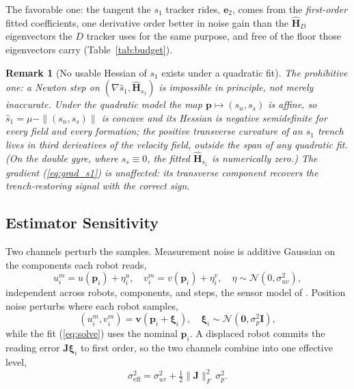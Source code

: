 \documentclass[lettersize,journal]{IEEEtran}
\newtheorem{remark}{Remark}
\begin{document}
The favorable one: the tangent the $s_1$ tracker rides,
$\mathbf{e}_2$, comes from the \emph{first-order} fitted coefficients,
one derivative order better in noise gain than the
$\hat{\mathbf{H}}_D$ eigenvectors the $D$ tracker uses for the same
purpose, and free of the floor those eigenvectors carry
(Table~\ref{tab:budget}).

\begin{remark}[No usable Hessian of $s_1$ exists under a quadratic fit]
\label{rem:s1hess}
The prohibitive one: a Newton step on $(\nabla \hat{s}_1,
\hat{\mathbf{H}}_{s_1})$ is impossible in principle, not merely
inaccurate. Under the quadratic model the map $\mathbf{p} \mapsto (s_n,
s_s)$ is affine, so $\hat{s}_1 = \mu - \|(s_n, s_s)\|$ is concave and its
Hessian is negative semidefinite \emph{for every field and every
formation}; the positive transverse curvature of an $s_1$ trench lives
in third derivatives of the velocity field, outside the span of any
quadratic fit. (On the double gyre, where $s_s \equiv 0$, the fitted
$\hat{\mathbf{H}}_{s_1}$ is numerically zero.) The gradient
(\ref{eq:grad_s1}) is unaffected: its transverse component recovers the
trench-restoring signal with the correct sign.
\end{remark}

\subsection{Estimator Sensitivity}
\label{sec:sensitivity}

Two channels perturb the samples. Measurement noise is additive
Gaussian on the components each robot reads,
\begin{equation}
    u_i^m = u(\mathbf{p}_i) + \eta_i^u, \quad
    v_i^m = v(\mathbf{p}_i) + \eta_i^v,
    \quad \eta \sim \mathcal{N}(0, \sigma_{uv}^2),
    \label{eq:meas_noise}
\end{equation}
independent across robots, components, and steps, the sensor model of
\cite{9}. Position noise perturbs where each robot
samples,
\begin{equation}
    (u_i^m, v_i^m) = \mathbf{v}(\mathbf{p}_i + \boldsymbol{\xi}_i), \quad
    \boldsymbol{\xi}_i \sim \mathcal{N}(\mathbf{0}, \sigma_p^2 \mathbf{I}),
    \label{eq:pos_noise}
\end{equation}
while the fit (\ref{eq:solve}) uses the nominal $\mathbf{p}_i$. A
displaced robot commits the reading error
$\mathbf{J}\boldsymbol{\xi}_i$ to first order, so the two channels
combine into one effective level,
\begin{equation}
    \sigma_{\mathrm{eff}}^2 = \sigma_{uv}^2
        + \tfrac{1}{2}\lVert\mathbf{J}\rVert_F^2\,\sigma_p^2 .
    \label{eq:sigma_eff}
\end{equation}
\end{document}

